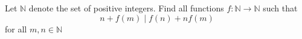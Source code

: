 Let $\mathbb{N}$ denote the set of positive integers. Find all functions $f:\mathbb{N}\longrightarrow\mathbb{N}$ such that\[n+f(m)\mid f(n)+nf(m)\]for all $m,n\in \mathbb{N}$